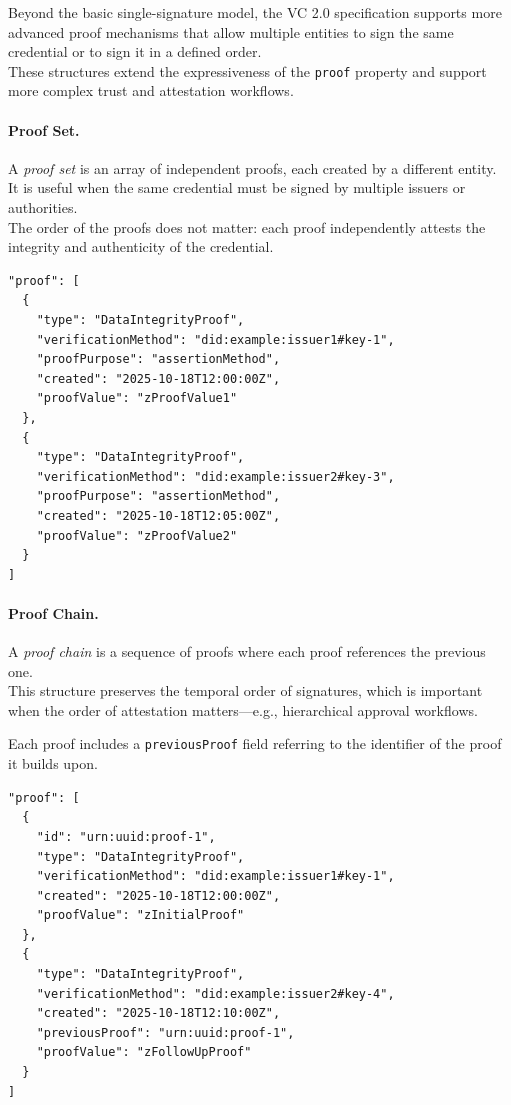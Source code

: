 Beyond the basic single-signature model, the VC 2.0 specification supports more advanced proof mechanisms that allow multiple entities to sign the same credential or to sign it in a defined order.\\
These structures extend the expressiveness of the \texttt{proof} property and support more complex trust and attestation workflows.

\paragraph{Proof Set.}
A \emph{proof set} is an array of independent proofs, each created by a different entity.  \\
It is useful when the same credential must be signed by multiple issuers or authorities.  \\
The order of the proofs does not matter: each proof independently attests the integrity and authenticity of the credential.

\begin{verbatim}
"proof": [
  {
    "type": "DataIntegrityProof",
    "verificationMethod": "did:example:issuer1#key-1",
    "proofPurpose": "assertionMethod",
    "created": "2025-10-18T12:00:00Z",
    "proofValue": "zProofValue1"
  },
  {
    "type": "DataIntegrityProof",
    "verificationMethod": "did:example:issuer2#key-3",
    "proofPurpose": "assertionMethod",
    "created": "2025-10-18T12:05:00Z",
    "proofValue": "zProofValue2"
  }
]
\end{verbatim}

\paragraph{Proof Chain.}
A \emph{proof chain} is a sequence of proofs where each proof references the previous one. \\
This structure preserves the temporal order of signatures, which is important when the order of attestation matters—e.g., hierarchical approval workflows.
\medskip

\noindent
Each proof includes a \texttt{previousProof} field referring to the identifier of
the proof it builds upon.

\begin{verbatim}
"proof": [
  {
    "id": "urn:uuid:proof-1",
    "type": "DataIntegrityProof",
    "verificationMethod": "did:example:issuer1#key-1",
    "created": "2025-10-18T12:00:00Z",
    "proofValue": "zInitialProof"
  },
  {
    "type": "DataIntegrityProof",
    "verificationMethod": "did:example:issuer2#key-4",
    "created": "2025-10-18T12:10:00Z",
    "previousProof": "urn:uuid:proof-1",
    "proofValue": "zFollowUpProof"
  }
]
\end{verbatim}

